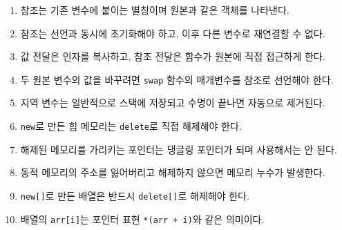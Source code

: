 \documentclass[11pt,a4paper]{article}
\begin{document}
\begin{enumerate}
    \item 참조는 기존 변수에 붙이는 별칭이며 원본과 같은 객체를 나타낸다.
    \item 참조는 선언과 동시에 초기화해야 하고, 이후 다른 변수로 재연결할 수 없다.
    \item 값 전달은 인자를 복사하고, 참조 전달은 함수가 원본에 직접 접근하게 한다.
    \item 두 원본 변수의 값을 바꾸려면 \texttt{swap} 함수의 매개변수를 참조로 선언해야 한다.
    \item 지역 변수는 일반적으로 스택에 저장되고 수명이 끝나면 자동으로 제거된다.
    \item \texttt{new}로 만든 힙 메모리는 \texttt{delete}로 직접 해제해야 한다.
    \item 해제된 메모리를 가리키는 포인터는 댕글링 포인터가 되며 사용해서는 안 된다.
    \item 동적 메모리의 주소를 잃어버리고 해제하지 않으면 메모리 누수가 발생한다.
    \item \texttt{new[]}로 만든 배열은 반드시 \texttt{delete[]}로 해제해야 한다.
    \item 배열의 \texttt{arr[i]}는 포인터 표현 \texttt{*(arr + i)}와 같은 의미이다.
\end{enumerate}
\end{document}
